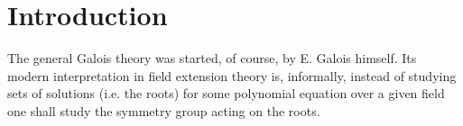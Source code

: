 \section{Introduction}
The general Galois theory was started, of course, by E. Galois himself. Its modern interpretation in field extension theory is, informally, instead of studying sets of solutions (i.e. the roots) for some polynomial equation over a given field one shall study the symmetry group acting on the roots.\\
